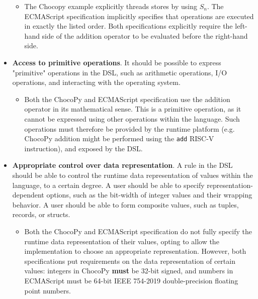 \begin{itemize}
  \begin{itemize}
    \item The Chocopy example explicitly threads stores by using $ S_n $. The ECMAScript specification implicitly specifies that operations are executed in exactly the listed order. Both specifications explicitly require the left-hand side of the addition operator to be evaluated before the right-hand side.
  \end{itemize}
  \item \textbf{Access to primitive operations}. It should be possible to express "primitive" operations in the \ac{DSL}, such as arithmetic operations, I/O operations, and interacting with the operating system.
  \begin{itemize}
    \item Both the ChocoPy and ECMAScript specification use the addition operator in its mathematical sense. This is a primitive operation, as it cannot be expressed using other operations within the language. Such operations must therefore be provided by the runtime platform (e.g. ChocoPy addition might be performed using the \texttt{add} RISC-V instruction), and exposed by the \ac{DSL}.
  \end{itemize}
  \item \textbf{Appropriate control over data representation}. A rule in the \ac{DSL} should be able to control the runtime data representation of values within the language, to a certain degree. A user should be able to specify representation-dependent options, such as the bit-width of integer values and their wrapping behavior. A user should be able to form composite values, such as tuples, records, or structs.
  \begin{itemize}
    \item Both the ChocoPy and ECMAScript specification do not fully specify the runtime data representation of their values, opting to allow the implementation to choose an appropriate representation. However, both specifications put requirements on the data representation of certain values: integers in ChocoPy \textbf{must} be 32-bit signed, and numbers in ECMAScript must be 64-bit IEEE 754-2019 \cite{8766229} double-precision floating point numbers.
  \end{itemize}
\end{itemize}


